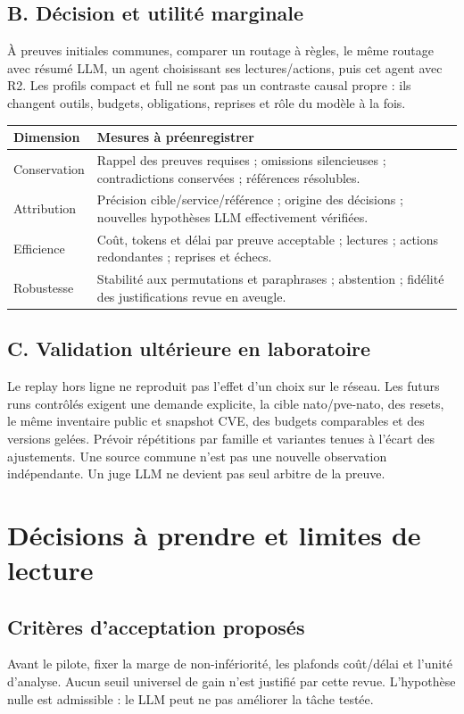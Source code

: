 \documentclass[11pt,a4paper]{article}
\begin{document}
\subsection{B. Décision et utilité marginale}
À preuves initiales communes, comparer un routage à règles, le même routage avec résumé LLM, un agent choisissant ses lectures/actions, puis cet agent avec R2. Les profils compact et full ne sont pas un contraste causal propre : ils changent outils, budgets, obligations, reprises et rôle du modèle à la fois.

\noindent\begin{tabularx}{\linewidth}{@{}p{38mm}Y@{}}
\toprule
\textbf{Dimension} & \textbf{Mesures à préenregistrer} \\
\midrule
Conservation & Rappel des preuves requises ; omissions silencieuses ; contradictions conservées ; références résolubles. \\
Attribution & Précision cible/service/référence ; origine des décisions ; nouvelles hypothèses LLM effectivement vérifiées. \\
Efficience & Coût, tokens et délai par preuve acceptable ; lectures ; actions redondantes ; reprises et échecs. \\
Robustesse & Stabilité aux permutations et paraphrases ; abstention ; fidélité des justifications revue en aveugle. \\
\bottomrule
\end{tabularx}

\subsection{C. Validation ultérieure en laboratoire}
Le replay hors ligne ne reproduit pas l'effet d'un choix sur le réseau. Les futurs runs contrôlés exigent une demande explicite, la cible nato/pve-nato, des resets, le même inventaire public et snapshot CVE, des budgets comparables et des versions gelées. Prévoir répétitions par famille et variantes tenues à l'écart des ajustements. Une source commune n'est pas une nouvelle observation indépendante. Un juge LLM ne devient pas seul arbitre de la preuve.

\section{Décisions à prendre et limites de lecture}
\subsection{Critères d'acceptation proposés}
Avant le pilote, fixer la marge de non-infériorité, les plafonds coût/délai et l'unité d'analyse. Aucun seuil universel de gain n'est justifié par cette revue. L'hypothèse nulle est admissible : le LLM peut ne pas améliorer la tâche testée.
\end{document}
